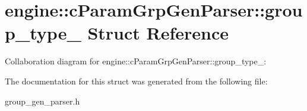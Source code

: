 \hypertarget{structengine_1_1cParamGrpGenParser_1_1group__type__}{\section{engine\-:\-:c\-Param\-Grp\-Gen\-Parser\-:\-:group\-\_\-type\-\_\- Struct Reference}
\label{structengine_1_1cParamGrpGenParser_1_1group__type__}
}


Collaboration diagram for engine\-:\-:c\-Param\-Grp\-Gen\-Parser\-:\-:group\-\_\-type\-\_\-\-:


The documentation for this struct was generated from the following file\-:\begin{DoxyCompactItemize}
\item 
group\-\_\-gen\-\_\-parser.\-h\end{DoxyCompactItemize}
